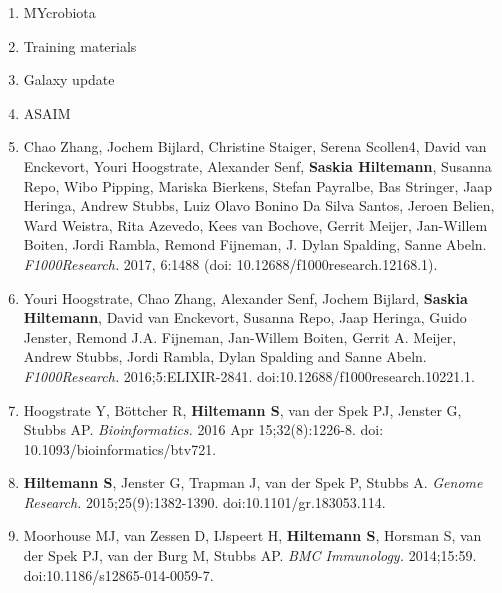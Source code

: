 \documentclass[]{shiltemann-cv}
\begin{document}
\begin{enumerate}
\item MYcrobiota

\item Training materials

\item Galaxy update

\item ASAIM

\item Chao Zhang, Jochem Bijlard, Christine Staiger, Serena Scollen4, David van Enckevort, Youri Hoogstrate, Alexander Senf, \textbf{Saskia Hiltemann}, Susanna Repo, Wibo Pipping, Mariska Bierkens, Stefan Payralbe, Bas Stringer, Jaap Heringa, Andrew Stubbs, Luiz Olavo Bonino Da Silva Santos, Jeroen Belien, Ward Weistra, Rita Azevedo, Kees van Bochove, Gerrit Meijer, Jan-Willem Boiten, Jordi Rambla, Remond Fijneman, J. Dylan Spalding, Sanne Abeln. {\color{lightgray}{Systematically linking tranSMART, Galaxy and EGA for reusing human translational research data.}}  \textit{F1000Research.} 2017, 6:1488 (doi: 10.12688/f1000research.12168.1).

\item Youri Hoogstrate, Chao Zhang, Alexander Senf, Jochem Bijlard, \textbf{Saskia Hiltemann}, David van Enckevort, Susanna Repo, Jaap Heringa, Guido Jenster, Remond J.A. Fijneman, Jan-Willem Boiten, Gerrit A. Meijer, Andrew Stubbs, Jordi Rambla, Dylan Spalding and Sanne Abeln. {\color{lightgray}{Integration of EGA secure data access into Galaxy.}}  \textit{F1000Research.} 2016;5:ELIXIR-2841. doi:10.12688/f1000research.10221.1.

\item Hoogstrate Y, Böttcher R, \textbf{Hiltemann S}, van der Spek PJ, Jenster G, Stubbs AP. {\color{lightgray}{FuMa: reporting overlap in RNA-seq detected fusion genes.}} \textit{Bioinformatics.} 2016 Apr 15;32(8):1226-8. doi: 10.1093/bioinformatics/btv721.

\item \textbf{Hiltemann S}, Jenster G, Trapman J, van der Spek P, Stubbs A. {\color{lightgray}{Discriminating somatic and germline mutations in tumor DNA samples without matching normals.}} \textit{Genome Research.} 2015;25(9):1382-1390. doi:10.1101/gr.183053.114.

\item Moorhouse MJ, van Zessen D, IJspeert H, \textbf{Hiltemann S}, Horsman S, van der Spek PJ, van der Burg M, Stubbs AP. {\color{lightgray}{ImmunoGlobulin galaxy (IGGalaxy) for simple determination and quantitation of immunoglobulin heavy chain rearrangements from NGS.}} \textit{BMC Immunology.} 2014;15:59. doi:10.1186/s12865-014-0059-7.


\end{enumerate}
\end{document}
